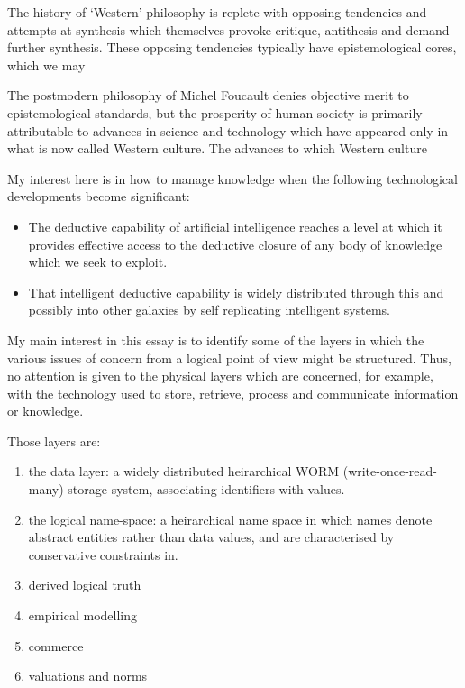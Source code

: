 \documentclass[10pt,titlepage]{article}
\begin{document}
The history of `Western' philosophy is replete with opposing tendencies and attempts at synthesis which themselves provoke critique, antithesis and demand further synthesis.
These opposing tendencies typically have epistemological cores, which we may 


The postmodern philosophy of Michel Foucault denies objective merit to epistemological standards, but the prosperity of human society is primarily attributable to advances in science and technology which have appeared only in what is now called Western culture.
The advances to which Western culture 


My interest here is in how to manage knowledge when the following technological developments become significant:

\begin{itemize}
\item The deductive capability of artificial intelligence reaches a level at which it provides effective access to the deductive closure of any body of knowledge which we seek to exploit.
\item That intelligent deductive capability is widely distributed through this and possibly into other galaxies by self replicating intelligent systems.
\end{itemize}



My main interest in this essay is to identify some of the layers in which the various issues of concern from a logical point of view might be structured.
Thus, no attention is given to the physical layers which are concerned, for example, with the technology used to store, retrieve, process and communicate information or knowledge.

Those layers are:

\begin{enumerate}
\item the data layer: a widely distributed heirarchical WORM (write-once-read-many) storage system, associating identifiers with values.
\item the logical name-space: a heirarchical name space in which names denote abstract entities rather than data values, and are characterised by conservative constraints in.

\item derived logical truth
\item empirical modelling
\item commerce
\item valuations and norms
\end{enumerate}
\end{document}

